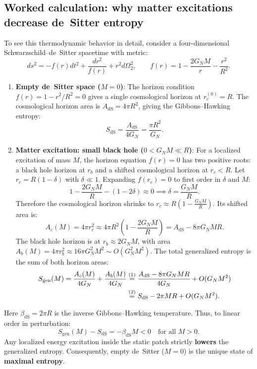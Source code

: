 \subsection*{Worked calculation: why matter excitations decrease de~Sitter entropy}

To see this thermodynamic behavior in detail, consider a four-dimensional Schwarzschild--de~Sitter spacetime
with metric:
\[
ds^2 = -f(r) dt^2 + \frac{dr^2}{f(r)} + r^2 d\Omega_2^2, \qquad f(r) = 1 - \frac{2 G_N M}{r} -
\frac{r^2}{R^2} .
\]
\begin{enumerate}
\item \textbf{Empty de~Sitter space ($M = 0$)}:
The horizon condition $f(r) = 1 - r^2/R^2 = 0$ gives a single cosmological horizon at $r_c^{(0)} = R$.
The cosmological horizon area is $A_{\text{dS}} = 4\pi R^2$, giving the Gibbons--Hawking entropy:
\[
S_{\text{dS}} = \frac{A_{\text{dS}}}{4 G_N} = \frac{\pi R^2}{G_N} .
\]
\item \textbf{Matter excitation: small black hole ($0 < G_N M \ll R$)}:
For a localized excitation of mass $M$, the horizon equation $f(r) = 0$ has two positive roots: a black hole
horizon at $r_b$ and a shifted cosmological horizon at $r_c < R$.
Let $r_c = R(1 - \delta)$ with $\delta \ll 1$. Expanding $f(r_c) = 0$ to first order in $\delta$ and $M$:
\[
1 - \frac{2 G_N M}{R} - (1 - 2\delta) \approx 0 \implies \delta = \frac{G_N M}{R} .
\]
Therefore the cosmological horizon shrinks to $r_c \approx R\left(1 - \frac{G_N M}{R}\right)$.
Its shifted area is:
\[
A_c(M) = 4\pi r_c^2 \approx 4\pi R^2 \left(1 - \frac{2 G_N M}{R}\right) = A_{\text{dS}} - 8\pi G_N M R .
\]
The black hole horizon is at $r_b \approx 2 G_N M$, with area $A_b(M) = 4\pi r_b^2 \approx 16\pi G_N^2 M^2
\sim O(G_N^2 M^2)$.
The total generalized entropy is the sum of both horizon areas:
\begin{align}
S_{\text{gen}}(M) = \frac{A_c(M)}{4 G_N} + \frac{A_b(M)}{4 G_N}
&\overset{(1)}{=} \frac{A_{\text{dS}} - 8\pi G_N M R}{4 G_N} + O(G_N M^2) \notag\\
&\overset{(2)}{=} S_{\text{dS}} - 2\pi M R + O(G_N M^2) . \notag
\end{align}
\quad
{}
\end{enumerate}
Here $\beta_{\text{dS}} = 2\pi R$ is the inverse Gibbons--Hawking temperature. Thus, to linear order in
perturbation:
\[
S_{\text{gen}}(M) - S_{\text{dS}} = -\beta_{\text{dS}} M < 0 \quad \text{for all } M > 0 .
\]
Any localized energy excitation inside the static patch strictly \textbf{lowers} the generalized entropy.
Consequently, empty de~Sitter ($M = 0$) is the unique state of \textbf{maximal entropy}.

